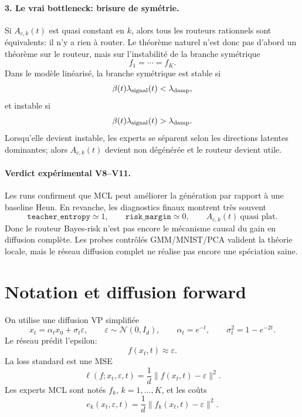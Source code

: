 \documentclass[11pt,a4paper]{article}
\newcommand{\1}{\mathbf{1}}
\newcommand{\eps}{\varepsilon}
\newcommand{\xt}{x_t}
\newcommand{\xzero}{x_0}
\begin{document}
\paragraph{3. Le vrai bottleneck: brisure de symétrie.}
Si $A_{c,k}(t)$ est quasi constant en $k$, alors tous les routeurs rationnels sont équivalents: il n'y a rien à router. Le théorème naturel n'est donc pas d'abord un théorème sur le routeur, mais sur l'instabilité de la branche symétrique
\[
f_1=\cdots=f_K.
\]
Dans le modèle linéarisé, la branche symétrique est stable si
\[
\beta(t)\lambda_{\rm signal}(t)<\lambda_{\rm damp},
\]
et instable si
\[
\beta(t)\lambda_{\rm signal}(t)>\lambda_{\rm damp}.
\]
Lorsqu'elle devient instable, les experts se séparent selon les directions latentes dominantes; alors $A_{c,k}(t)$ devient non dégénérée et le routeur devient utile.

\paragraph{Verdict expérimental V8--V11.}
Les runs confirment que MCL peut améliorer la génération par rapport à une baseline Heun. En revanche, les diagnostics finaux montrent très souvent
\[
\texttt{teacher\_entropy}\simeq 1,
\qquad
\texttt{risk\_margin}\simeq 0,
\qquad
A_{c,k}(t)\ \text{quasi plat}.
\]
Donc le routeur Bayes-risk n'est pas encore le mécanisme causal du gain en diffusion complète. Les probes contrôlés GMM/MNIST/PCA valident la théorie locale, mais le réseau diffusion complet ne réalise pas encore une spéciation saine.

\section{Notation et diffusion forward}

On utilise une diffusion VP simplifiée
\begin{equation}
\xt=\alpha_t\xzero+\sigma_t\eps,
\qquad
\eps\sim\mathcal N(0,I_d),
\qquad
\alpha_t=e^{-t},
\qquad
\sigma_t^2=1-e^{-2t}.
\label{eq:vp}
\end{equation}
Le réseau prédit l'epsilon:
\[
f(\xt,t)\approx \eps.
\]
La loss standard est une MSE
\[
\ell(f;\xt,\eps,t)=\frac1d\|f(\xt,t)-\eps\|^2.
\]
Les experts MCL sont notés $f_k$, $k=1,\dots,K$, et les coûts
\begin{equation}
 e_k(\xt,\eps,t)=\frac1d\|f_k(\xt,t)-\eps\|^2.
\label{eq:ek}
\end{equation}
\end{document}
